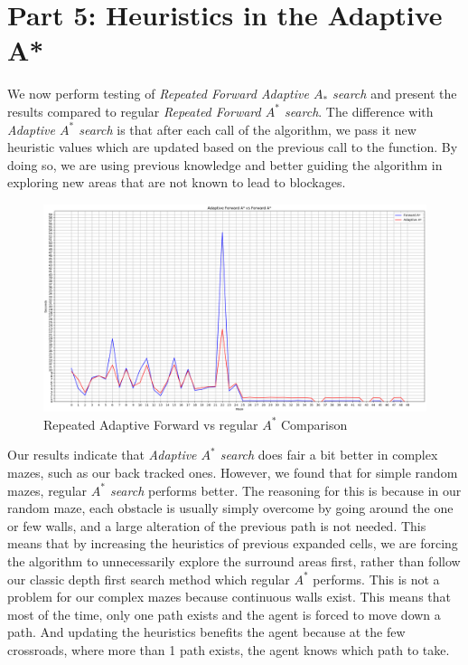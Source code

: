 \section{Part 5: Heuristics in the Adaptive A*}
\label{sec: Part 5}

We now perform testing of \emph{Repeated Forward Adaptive $A_*$ search} and present the results compared to regular \emph{Repeated Forward $A^*$ search}. The difference with \emph{Adaptive $A^*$ search} is that after each call of the algorithm, we pass it new heuristic values which are updated based on the previous call to the function. By doing so, we are using previous knowledge and better guiding the algorithm in exploring new areas that are not known to lead to blockages.
\begin{figure}[H]
  \centering
  \includegraphics[width=1\linewidth]{Report/Part5/Figure_1.png}  
\caption{Repeated Adaptive Forward vs regular $A^*$ Comparison}
\end{figure}

Our results indicate that \emph{Adaptive $A^*$ search} does fair a bit better in complex mazes, such as our back tracked ones. However, we found that for simple random mazes, regular \emph{$A^*$ search} performs better. The reasoning for this is because in our random maze, each obstacle is usually simply overcome by going around the one or few walls, and a large alteration of the previous path is not needed. This means that by increasing the heuristics of previous expanded cells, we are forcing the algorithm to unnecessarily explore the surround areas first, rather than follow our classic depth first search method which regular $A^*$ performs. This is not a problem for our complex mazes because continuous walls exist. This means that most of the time, only one path exists and the agent is forced to move down a path. And updating the heuristics benefits the agent because at the few crossroads, where more than 1 path exists, the agent knows which path to take.